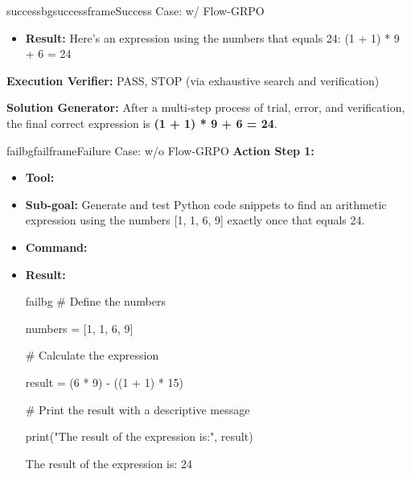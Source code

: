 \begin{small}
\begin{center}
\begin{casebox}{successbg}{successframe}{Success Case: \model w/ Flow-GRPO}
\begin{itemize}[nosep, leftmargin=*]
        \item \textbf{Result:} Here's an expression using the numbers that equals 24: (1 + 1) * 9 + 6 = 24
    \end{itemize}

    \vspace{1em}

    \textbf{Execution Verifier:} \textcolor{successframe}{PASS, STOP (via exhaustive search and verification)}

    \vspace{1em}

    \textbf{Solution Generator: } \textcolor{successframe}{After a multi-step process of trial, error, and verification, the final correct expression is \textbf{(1 + 1) * 9 + 6 = 24}.}

\end{casebox}

\begin{casebox}{failbg}{failframe}{Failure Case: \model w/o Flow-GRPO}
    \textbf{Action Step 1:}
    \begin{itemize}[nosep, leftmargin=*]
        \item \textbf{Tool:} 
        \item \textbf{Sub-goal:} Generate and test Python code snippets to find an arithmetic expression using the numbers [1, 1, 6, 9] exactly once that equals 24.
        \item \textbf{Command:} 
        
        \item \textbf{Result:}
        \begin{casecode}{failbg}
\# Define the numbers

numbers = [1, 1, 6, 9]

\# Calculate the expression

result = (6 * 9) - ((1 + 1) * 15)

\# Print the result with a descriptive message

print("The result of the expression is:", result)
        \end{casecode}
        The result of the expression is: 24
    \end{itemize}


\end{casebox}
\end{center}
\end{small}

